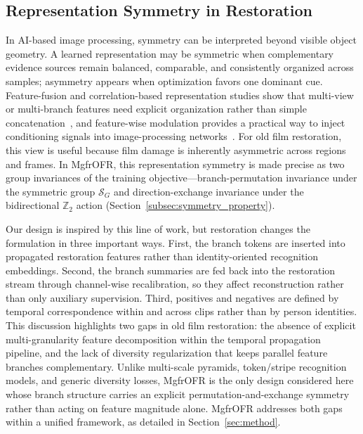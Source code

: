 \subsection{Representation Symmetry in Restoration}
\label{subsec:symmetry_ai}

In AI-based image processing, symmetry can be interpreted beyond visible object geometry. A learned representation may be symmetric when complementary evidence sources remain balanced, comparable, and consistently organized across samples; asymmetry appears when optimization favors one dominant cue. Feature-fusion and correlation-based representation studies show that multi-view or multi-branch features need explicit organization rather than simple concatenation~\cite{yu2021multiview_tensor_fusion,qian2020multiview_matrix_correlation}, and feature-wise modulation provides a practical way to inject conditioning signals into image-processing networks~\cite{perez2018film}. For old film restoration, this view is useful because film damage is inherently asymmetric across regions and frames. In MgfrOFR, this representation symmetry is made precise as two group invariances of the training objective---branch-permutation invariance under the symmetric group $\mathcal{S}_G$ and direction-exchange invariance under the bidirectional $\mathbb{Z}_2$ action (Section~\ref{subsec:symmetry_property}).

Our design is inspired by this line of work, but restoration changes the formulation in three important ways. First, the branch tokens are inserted into propagated restoration features rather than identity-oriented recognition embeddings. Second, the branch summaries are fed back into the restoration stream through channel-wise recalibration, so they affect reconstruction rather than only auxiliary supervision. Third, positives and negatives are defined by temporal correspondence within and across clips rather than by person identities. This discussion highlights two gaps in old film restoration: the absence of explicit multi-granularity feature decomposition within the temporal propagation pipeline, and the lack of diversity regularization that keeps parallel feature branches complementary. Unlike multi-scale pyramids, token/stripe recognition models, and generic diversity losses, MgfrOFR is the only design considered here whose branch structure carries an explicit permutation-and-exchange symmetry rather than acting on feature magnitude alone. MgfrOFR addresses both gaps within a unified framework, as detailed in Section~\ref{sec:method}.
